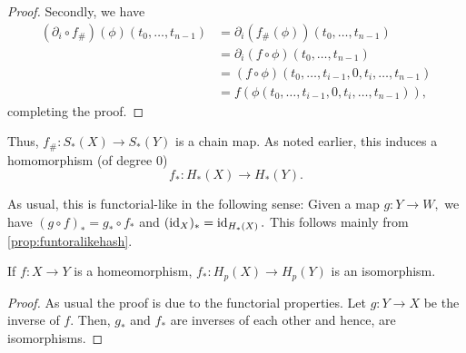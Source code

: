 \documentclass[12pt]{article}
\begin{document}
\begin{proof}
	Secondly, we have
	\begin{align*} 
		(\partial_i\circ f_\#)(\phi)(t_0, \ldots, t_{n-1}) &= \partial_i(f_\#(\phi))(t_0, \ldots, t_{n-1})\\
		&= \partial_i(f\circ\phi)(t_0, \ldots, t_{n-1})\\
		&= (f\circ\phi)(t_0, \ldots, t_{i-1}, 0, t_i, \ldots, t_{n-1})\\
		&= f(\phi(t_0, \ldots, t_{i-1}, 0, t_i, \ldots, t_{n-1})),
	\end{align*}
	completing the proof.
\end{proof}

Thus, $f_\#:S_*(X) \to S_*(Y)$ is a chain map. As noted earlier, this induces a homomorphism (of degree $0$)
\begin{equation*} 
	f_*:H_*(X) \to H_*(Y).
\end{equation*}

As usual, this is functorial-like in the following sense: Given a map $g:Y\to W,$ we have $(g\circ f)_* = g_*\circ f_*$ and $(\operatorname{id}_X)_* = \operatorname{id}_{H_*(X)}.$ This follows mainly from \cref{prop:funtoralikehash}.

\begin{thm}
	If $f:X\to Y$ is a homeomorphism, $f_*:H_p(X) \to H_p(Y)$ is an isomorphism.
\end{thm}
\begin{proof} 
	As usual the proof is due to the functorial properties. Let $g:Y\to X$ be the inverse of $f.$ Then, $g_*$ and $f_*$ are inverses of each other and hence, are isomorphisms.
\end{proof}
\end{document}
